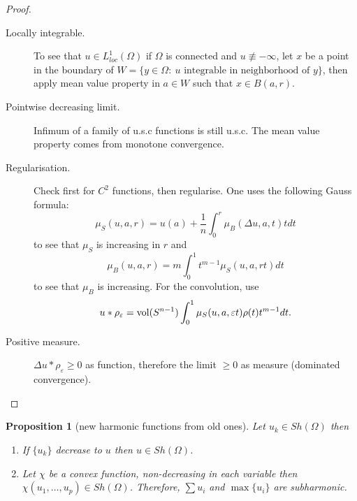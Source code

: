 \documentclass[11pt]{article}
\newtheorem{proposition}{Proposition}[theorem]
\newcommand{\vol}{\mathop{\rm vol}\nolimits}
\begin{document}
\begin{proof}
\begin{description}
\item[{Locally integrable.}] To see that \(u\in L^1_{loc}(\Omega)\) if \(\Omega\) is
connected and \(u\not\equiv -\infty\), let \(x\) be a point in the boundary of \(W=\{y\in \Omega:\ u\text{ integrable in neighborhood of } y\}\), then apply mean value property in \(a\in W\) such that \(x\in B(a,r)\).
\item[{Pointwise decreasing limit.}] Infimum of a family of u.s.c functions is still u.s.c. The
mean value property comes from monotone convergence.
\item[{Regularisation.}] Check first for \(C^2\) functions, then regularise. One uses the
following Gauss formula: 
\[
     \mu_S(u,a,r) = u(a) + \frac{1}{n}\int_0^r\mu_B(\Delta u, a, t)tdt
     \]
to see that \(\mu_S\) is increasing in \(r\) and
\[
     \mu_B(u,a,r) = m\int_0^1 t^{m-1}\mu_S(u,a,rt)dt
     \]
to see that \(\mu_B\) is increasing. For the convolution, use
\[
     u*\rho_\varepsilon = \vol(S^{n-1})\int_0^1 \mu_S(u,a,\varepsilon t)\rho(t) t^{m-1}dt.
     \]
\item[{Positive measure.}] \(\Delta u * \rho_\varepsilon \geq 0\) as function, therefore the
limit \(\geq 0\) as measure (dominated convergence).
\end{description}
\end{proof}

\begin{proposition}[new harmonic functions from old ones]
Let \(u_k \in Sh(\Omega)\) then
\begin{enumerate}
\item If \(\{u_k\}\) decrease to \(u\) then \(u\in Sh(\Omega)\).
\item Let \(\chi\) be a convex function, non-decreasing in each variable then \(\chi(u_1,\dots,u_p) \in Sh(\Omega)\). Therefore, \(\sum u_i\) and \(\max\{u_i\}\)
are subharmonic.
\end{enumerate}
\end{proposition}
\end{document}
